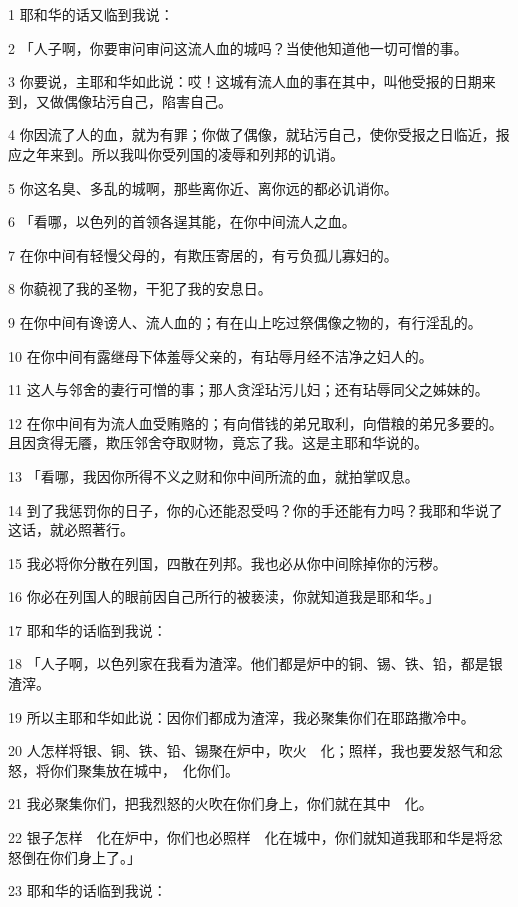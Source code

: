 \par 1 耶和华的话又临到我说：
\par 2 「人子啊，你要审问审问这流人血的城吗？当使他知道他一切可憎的事。
\par 3 你要说，主耶和华如此说：哎！这城有流人血的事在其中，叫他受报的日期来到，又做偶像玷污自己，陷害自己。
\par 4 你因流了人的血，就为有罪；你做了偶像，就玷污自己，使你受报之日临近，报应之年来到。所以我叫你受列国的凌辱和列邦的讥诮。
\par 5 你这名臭、多乱的城啊，那些离你近、离你远的都必讥诮你。
\par 6 「看哪，以色列的首领各逞其能，在你中间流人之血。
\par 7 在你中间有轻慢父母的，有欺压寄居的，有亏负孤儿寡妇的。
\par 8 你藐视了我的圣物，干犯了我的安息日。
\par 9 在你中间有谗谤人、流人血的；有在山上吃过祭偶像之物的，有行淫乱的。
\par 10 在你中间有露继母下体羞辱父亲的，有玷辱月经不洁净之妇人的。
\par 11 这人与邻舍的妻行可憎的事；那人贪淫玷污儿妇；还有玷辱同父之姊妹的。
\par 12 在你中间有为流人血受贿赂的；有向借钱的弟兄取利，向借粮的弟兄多要的。且因贪得无餍，欺压邻舍夺取财物，竟忘了我。这是主耶和华说的。
\par 13 「看哪，我因你所得不义之财和你中间所流的血，就拍掌叹息。
\par 14 到了我惩罚你的日子，你的心还能忍受吗？你的手还能有力吗？我耶和华说了这话，就必照著行。
\par 15 我必将你分散在列国，四散在列邦。我也必从你中间除掉你的污秽。
\par 16 你必在列国人的眼前因自己所行的被亵渎，你就知道我是耶和华。」
\par 17 耶和华的话临到我说：
\par 18 「人子啊，以色列家在我看为渣滓。他们都是炉中的铜、锡、铁、铅，都是银渣滓。
\par 19 所以主耶和华如此说：因你们都成为渣滓，我必聚集你们在耶路撒冷中。
\par 20 人怎样将银、铜、铁、铅、锡聚在炉中，吹火　化；照样，我也要发怒气和忿怒，将你们聚集放在城中，　化你们。
\par 21 我必聚集你们，把我烈怒的火吹在你们身上，你们就在其中　化。
\par 22 银子怎样　化在炉中，你们也必照样　化在城中，你们就知道我耶和华是将忿怒倒在你们身上了。」
\par 23 耶和华的话临到我说：

